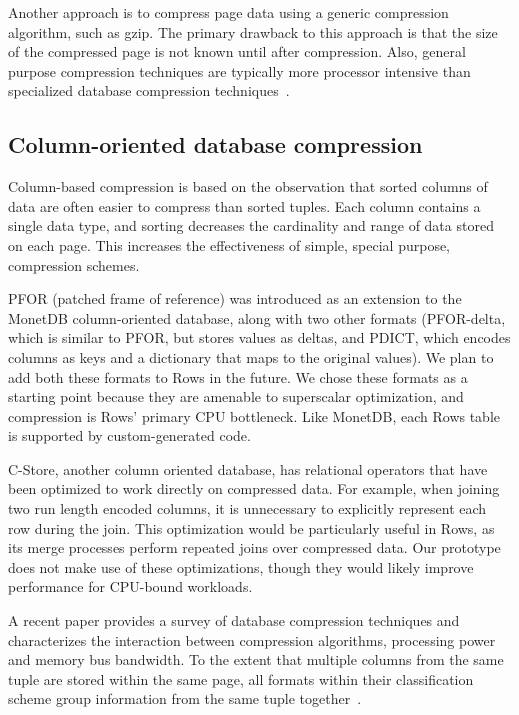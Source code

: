 \documentclass{sig-alternate-sigmod08}
\newcommand{\rows}{Rows\xspace}
\newcommand{\rowss}{Rows'\xspace}
\begin{document}
Another approach is to compress page data using a generic compression
algorithm, such as gzip.  The primary drawback to this approach is
that the size of the compressed page is not known until after
compression.  Also, general purpose compression techniques are
typically more processor intensive than specialized database
compression techniques~\cite{rowImplementationPerf}.

\subsection{Column-oriented database compression}

Column-based compression is based on the observation that sorted
columns of data are often easier to compress than sorted tuples.  Each
column contains a single data type, and sorting decreases the
cardinality and range of data stored on each page.  This increases the
effectiveness of simple, special purpose, compression schemes.

PFOR (patched frame of reference) was introduced as an extension to
the MonetDB\cite{pfor} column-oriented database, along with two other
formats (PFOR-delta, which is similar to PFOR, but stores values as
deltas, and PDICT, which encodes columns as keys and a dictionary that
maps to the original values).  We plan to add both these formats to
\rows in the future.  We chose these formats as a starting
point because they are amenable to superscalar optimization, and
compression is \rowss primary CPU bottleneck.  Like MonetDB, each
\rows table is supported by custom-generated code.

C-Store, another column oriented database, has relational operators
that have been optimized to work directly on compressed
data\cite{compExec}.  For example, when joining two run length encoded
columns, it is unnecessary to explicitly represent each row during the
join.  This optimization would be particularly useful in \rows, as its
merge processes perform repeated joins over compressed data.  Our
prototype does not make use of these optimizations, though they would
likely improve performance for CPU-bound workloads.

A recent paper provides a survey of database compression
techniques and characterizes the interaction between compression
algorithms, processing power and memory bus bandwidth.  To the extent
that multiple columns from the same tuple are stored within the same
page, all formats within their classification scheme group information
from the same tuple together~\cite{bitsForChronos}.
\end{document}
